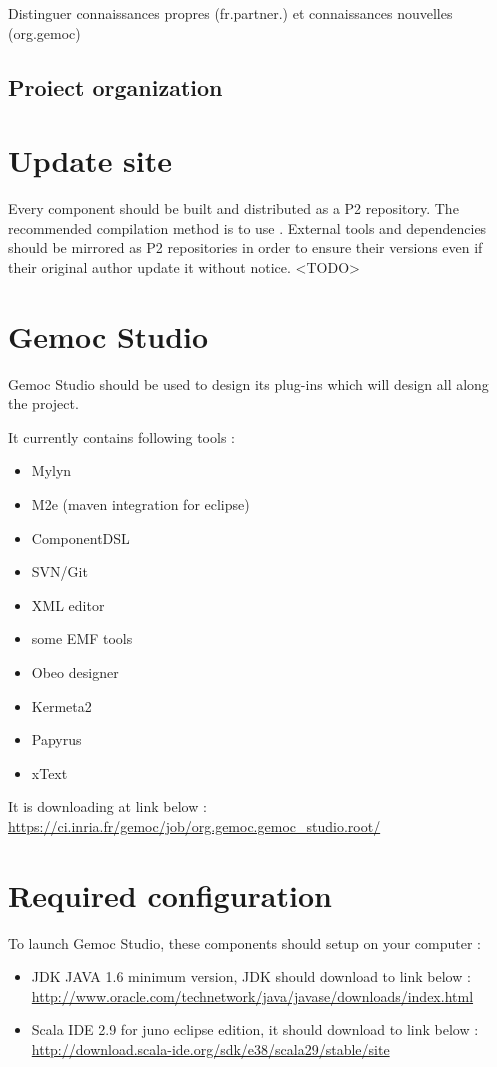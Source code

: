\documentclass{gemoc} %
\begin{document}
Distinguer connaissances propres (fr.partner.) et connaissances nouvelles (org.gemoc)
\subsection{Proiect organization}
\section{Update site}
Every component should be built and distributed as a P2 repository. The recommended compilation method is to use .
\newline
External tools and dependencies should be mirrored as P2 repositories in order to ensure their versions even if their original author update it without notice.
\newline
\textless TODO\textgreater
\section{Gemoc Studio}
Gemoc Studio should be used to design its plug-ins which will design all along the project.

It currently contains following tools :
\begin{itemize}
	\item Mylyn
	\item M2e (maven integration for eclipse)
	\item ComponentDSL
	\item SVN/Git
	\item XML editor
	\item some EMF tools
	\item Obeo designer
	\item Kermeta2
	\item Papyrus
	\item xText
\end{itemize}
It is downloading at link below :
\newline
\url {https://ci.inria.fr/gemoc/job/org.gemoc.gemoc_studio.root/}
\section{Required configuration}
To launch Gemoc Studio, these components should setup on your computer :
\begin{itemize}
	\item JDK JAVA 1.6 minimum version, JDK should download to link below :
	\newline
	\url {http://www.oracle.com/technetwork/java/javase/downloads/index.html}
	\item Scala IDE 2.9 for juno eclipse edition, it should download to link below :
	\newline
	\url {http://download.scala-ide.org/sdk/e38/scala29/stable/site}
\end{itemize}
\end{document}
